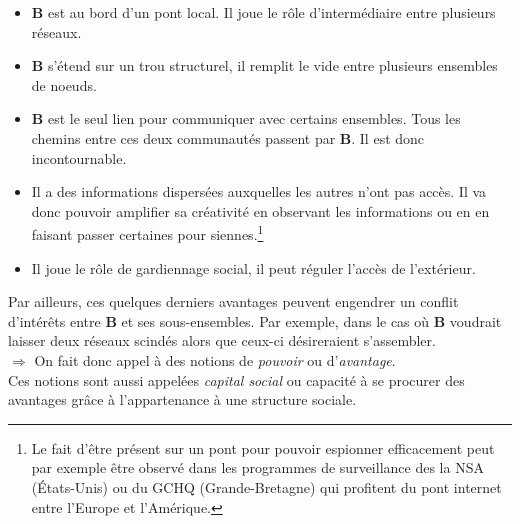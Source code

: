 \vspace{1ex}
\begin{itemize}
\item \textbf{B} est au bord d'un pont local. Il joue le rôle d'intermédiaire entre plusieurs réseaux.
\item \textbf{B} s'étend sur un trou structurel, il remplit le vide entre plusieurs ensembles de noeuds.
\item \textbf{B} est le seul lien pour communiquer avec certains ensembles. Tous les chemins entre ces deux communautés passent par \textbf{B}. Il est donc incontournable.
\item Il a des informations dispersées auxquelles les autres n'ont pas accès. Il va donc pouvoir amplifier sa créativité en observant les informations ou en en faisant passer certaines pour siennes.\footnote{Le fait d'être présent sur un pont pour pouvoir espionner efficacement peut par exemple être observé dans les programmes de surveillance des la NSA (États-Unis) ou du GCHQ (Grande-Bretagne) qui profitent du pont internet entre l'Europe et l'Amérique.}
\item Il joue le rôle de gardiennage social, il peut réguler l'accès de l'extérieur.
\end{itemize}

Par ailleurs, ces quelques derniers avantages peuvent engendrer un conflit d'intérêts entre \textbf{B} et ses sous-ensembles. Par exemple, dans le cas où \textbf{B} voudrait laisser deux réseaux scindés alors que ceux-ci désireraient s'assembler.\\

$\Rightarrow$ On fait donc appel à des notions de \textit{pouvoir} ou d'\textit{avantage}.\\

Ces notions sont aussi appelées \textit{capital social} ou capacité à se procurer des avantages grâce à l'appartenance à une structure sociale.

%

